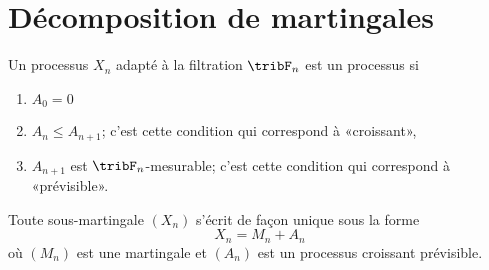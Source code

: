 \section{Décomposition de martingales}

\begin{definition}
    Un processus \( X_n\) adapté à la filtration \( \tribF_n\) est un processus  si
    \begin{enumerate}
        \item
            \( A_0=0\)
        \item
            \( A_n\leq A_{n+1}\); c'est cette condition qui correspond à «croissant»,
        \item
            \( A_{n+1}\) est \( \tribF_n\)-mesurable; c'est cette condition qui correspond à «prévisible».
    \end{enumerate}
\end{definition}

\begin{proposition}
    Toute sous-martingale \( (X_n)\) s'écrit de façon unique sous la forme 
    \begin{equation}\label{EqCCsAwbZ}
        X_n=M_n+A_n 
    \end{equation}
    où \( (M_n)\) est une martingale et \( (A_n)\) est un processus croissant prévisible.
\end{proposition}

